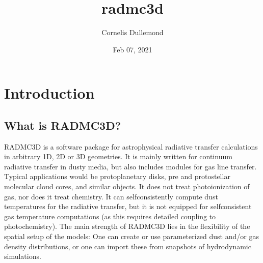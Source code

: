 \documentclass[letterpaper,10pt,english]{sphinxmanual}
\title{radmc3d}
\date{Feb 07, 2021}
\author{Cornelis Dullemond}
\begin{document}
\pagestyle{empty}
\sphinxmaketitle
\pagestyle{plain}
\sphinxtableofcontents
\pagestyle{normal}
\label{\detokenize{index::doc}}



\chapter{Introduction}
\label{\detokenize{introduction:introduction}}\label{\detokenize{introduction::doc}}

\section{What is RADMC\sphinxhyphen{}3D?}
\label{\detokenize{introduction:what-is-radmc-3d}}
RADMC\sphinxhyphen{}3D is a software package for astrophysical radiative transfer calculations
in arbitrary 1\sphinxhyphen{}D, 2\sphinxhyphen{}D or 3\sphinxhyphen{}D geometries. It is mainly written for continuum
radiative transfer in dusty media, but also includes modules for gas line
transfer. Typical applications would be protoplanetary disks, pre\sphinxhyphen{} and
proto\sphinxhyphen{}stellar molecular cloud cores, and similar objects. It does not treat
photoionization of gas, nor does it treat chemistry. It can self\sphinxhyphen{}consistently
compute dust temperatures for the radiative transfer, but it is not equipped for
self\sphinxhyphen{}consistent gas temperature computations (as this requires detailed coupling
to photochemistry). The main strength of RADMC\sphinxhyphen{}3D lies in the flexibility of the
spatial setup of the models: One can create or use parameterized dust and/or gas
density distributions, or one can import these from snapshots of hydrodynamic
simulations.
\end{document}
